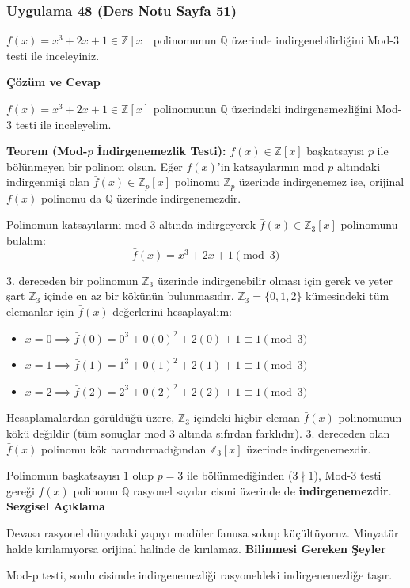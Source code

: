 \documentclass[11pt, a4paper]{article}
\newenvironment{cozum}{
    \vspace{0.5cm}
    \noindent\textcolor{green!60!black}{\faCheckCircle\enspace \textbf{\Large Çözüm ve Cevap}}\par\vspace{0.2cm}
}{}
\newenvironment{sezgisel}{
    \vspace{0.5cm}
    \noindent\textcolor{orange!80!black}{\faLightbulb\enspace \textbf{\Large Sezgisel Açıklama}}\par\vspace{0.2cm}
    \itshape
}{}
\newenvironment{bilgi}{
    \vspace{0.5cm}
    \noindent\textcolor{red!70!black}{\faExclamationTriangle\enspace \textbf{\Large Bilinmesi Gereken Şeyler}}\par\vspace{0.2cm}
}{}
\begin{document}
\newpage
\subsubsection{Uygulama 48 (Ders Notu Sayfa 51)}
\begin{sorubox}
$f(x)=x^3+2x+1 \in \mathbb{Z}[x]$ polinomunun $\mathbb{Q}$ üzerinde indirgenebilirliğini Mod-3 testi ile inceleyiniz.
\end{sorubox}
\begin{cozum}
$f(x) = x^{3} + 2x + 1 \in \mathbb{Z}[x]$ polinomunun $\mathbb{Q}$ üzerindeki indirgenemezliğini Mod-3 testi ile inceleyelim.

\textbf{Teorem (Mod-$p$ İndirgenemezlik Testi):} $f(x) \in \mathbb{Z}[x]$ başkatsayısı $p$ ile bölünmeyen bir polinom olsun. Eğer $f(x)$'in katsayılarının mod $p$ altındaki indirgenmişi olan $\bar{f}(x) \in \mathbb{Z}_p[x]$ polinomu $\mathbb{Z}_p$ üzerinde indirgenemez ise, orijinal $f(x)$ polinomu da $\mathbb{Q}$ üzerinde indirgenemezdir.

Polinomun katsayılarını mod 3 altında indirgeyerek $\bar{f}(x) \in \mathbb{Z}_{3}[x]$ polinomunu bulalım:
\[ \bar{f}(x) = x^{3} + 2x + 1 \pmod{3} \]

3. dereceden bir polinomun $\mathbb{Z}_{3}$ üzerinde indirgenebilir olması için gerek ve yeter şart $\mathbb{Z}_{3}$ içinde en az bir kökünün bulunmasıdır. $\mathbb{Z}_{3} = \{0, 1, 2\}$ kümesindeki tüm elemanlar için $\bar{f}(x)$ değerlerini hesaplayalım:
\begin{itemize}
    \item $x = 0 \implies \bar{f}(0) = 0^3 + 0(0)^2 + 2(0) + 1 \equiv 1 \pmod{3}$
    \item $x = 1 \implies \bar{f}(1) = 1^3 + 0(1)^2 + 2(1) + 1 \equiv 1 \pmod{3}$
    \item $x = 2 \implies \bar{f}(2) = 2^3 + 0(2)^2 + 2(2) + 1 \equiv 1 \pmod{3}$
\end{itemize}

Hesaplamalardan görüldüğü üzere, $\mathbb{Z}_{3}$ içindeki hiçbir eleman $\bar{f}(x)$ polinomunun kökü değildir (tüm sonuçlar mod 3 altında sıfırdan farklıdır). 3. dereceden olan $\bar{f}(x)$ polinomu kök barındırmadığından $\mathbb{Z}_{3}[x]$ üzerinde indirgenemezdir.

Polinomun başkatsayısı $1$ olup $p = 3$ ile bölünmediğinden ($3 \nmid 1$), Mod-3 testi gereği $f(x)$ polinomu $\mathbb{Q}$ rasyonel sayılar cismi üzerinde de \textbf{indirgenemezdir}.
\end{cozum}
\begin{sezgisel}
Devasa rasyonel dünyadaki yapıyı modüler fanusa sokup küçültüyoruz. Minyatür halde kırılamıyorsa orijinal halinde de kırılamaz.
\end{sezgisel}
\begin{bilgi}
Mod-p testi, sonlu cisimde indirgenemezliği rasyoneldeki indirgenemezliğe taşır.
\end{bilgi}
\end{document}
